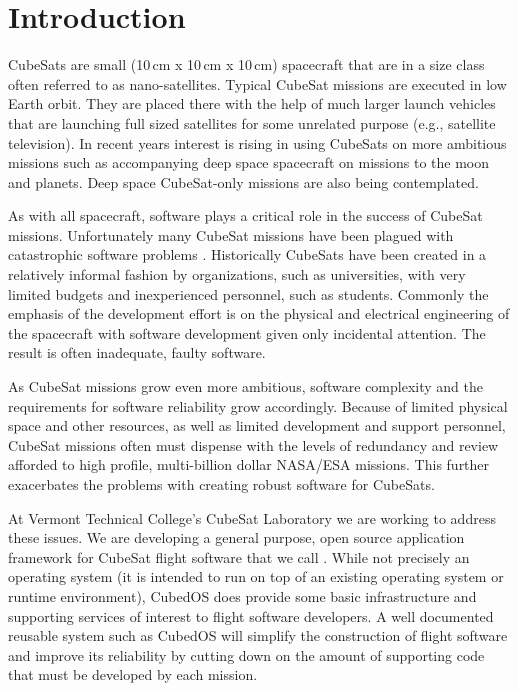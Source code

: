 
\section{Introduction}

CubeSats are small (10\,cm x 10\,cm x 10\,cm) spacecraft that are in a size class often referred
to as nano-satellites. Typical CubeSat missions are executed in low Earth orbit. They are placed
there with the help of much larger launch vehicles that are launching full sized satellites for
some unrelated purpose (e.g., satellite television). In recent years interest is rising in using
CubeSats on more ambitious missions such as accompanying deep space spacecraft on missions to the
moon and planets. Deep space CubeSat-only missions are also being contemplated. 

As with all spacecraft, software plays a critical role in the success of CubeSat missions.
Unfortunately many CubeSat missions have been plagued with catastrophic software problems
. Historically CubeSats have been created in a relatively informal
fashion by organizations, such as universities, with very limited budgets and inexperienced
personnel, such as students. Commonly the emphasis of the development effort is on the physical
and electrical engineering of the spacecraft with software development given only incidental
attention. The result is often inadequate, faulty software.

As CubeSat missions grow even more ambitious, software complexity and the requirements for
software reliability grow accordingly. Because of limited physical space and other resources, as
well as limited development and support personnel, CubeSat missions often must dispense with the
levels of redundancy and review afforded to high profile, multi-billion dollar NASA/ESA
missions. This further exacerbates the problems with creating robust software for CubeSats.

At Vermont Technical College's CubeSat Laboratory we are working to address these issues. We are
developing a general purpose, open source application framework for CubeSat flight software that
we call . While not precisely an operating system (it is intended to run on top
of an existing operating system or runtime environment), CubedOS does provide some basic
infrastructure and supporting services of interest to flight software developers. A well
documented reusable system such as CubedOS will simplify the construction of flight software and
improve its reliability by cutting down on the amount of supporting code that must be developed
by each mission.

